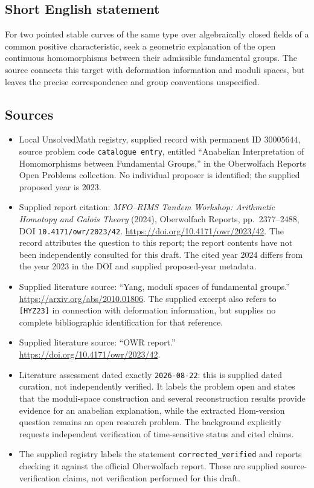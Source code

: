 \documentclass[11pt]{article}
\begin{document}
\subsection{Short English statement}
For two pointed stable curves of the same type over algebraically closed fields of a common positive characteristic, seek a geometric explanation of the open continuous homomorphisms between their admissible fundamental groups. The source connects this target with deformation information and moduli spaces, but leaves the precise correspondence and group conventions unspecified.
\subsection{Sources}
\begin{itemize}
\item Local UnsolvedMath registry, supplied record with permanent ID \(30005644\), source problem code \texttt{catalogue entry}, entitled ``Anabelian Interpretation of Homomorphisms between Fundamental Groups,'' in the Oberwolfach Reports Open Problems collection. No individual proposer is identified; the supplied proposed year is 2023.
\item Supplied report citation: \emph{MFO--RIMS Tandem Workshop: Arithmetic Homotopy and Galois Theory} (2024), Oberwolfach Reports, pp.~2377--2488, DOI \texttt{10.4171/owr/2023/42}. \url{https://doi.org/10.4171/owr/2023/42}. The record attributes the question to this report; the report contents have not been independently consulted for this draft. The cited year 2024 differs from the year 2023 in the DOI and supplied proposed-year metadata.
\item Supplied literature source: ``Yang, moduli spaces of fundamental groups.'' \url{https://arxiv.org/abs/2010.01806}. The supplied excerpt also refers to \texttt{[HYZ23]} in connection with deformation information, but supplies no complete bibliographic identification for that reference.
\item Supplied literature source: ``OWR report.'' \url{https://doi.org/10.4171/owr/2023/42}.
\item Literature assessment dated exactly \texttt{2026-08-22}: this is supplied dated curation, not independently verified. It labels the problem open and states that the moduli-space construction and several reconstruction results provide evidence for an anabelian explanation, while the extracted Hom-version question remains an open research problem. The background explicitly requests independent verification of time-sensitive status and cited claims.
\item The supplied registry labels the statement \texttt{corrected\_verified} and reports checking it against the official Oberwolfach report. These are supplied source-verification claims, not verification performed for this draft.
\end{itemize}
\end{document}
